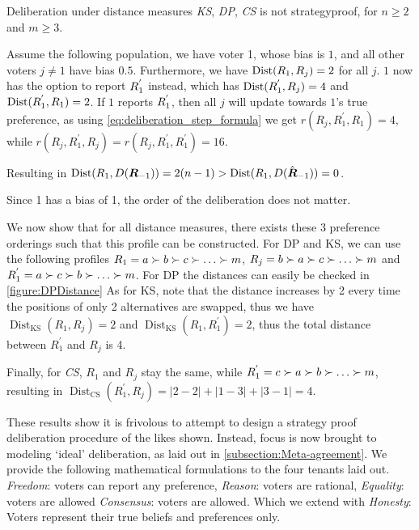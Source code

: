 \begin{proposition}
	Deliberation under distance measures \textit{KS}, \textit{ DP}, \textit{ CS} is not strategyproof, for $n \geq 2$ and $m \geq 3$.
\end{proposition}

\begin{proofc}
	Assume the following population, we have voter 1, whose bias is $1$, and all other voters $j \neq 1$ have bias $0.5$. Furthermore, we have $\operatorname{Dist}(R_1, R_j) = 2$ for all $j$. $1$ now has the option to report $R_{1}^{'}$ instead, which has $\operatorname{Dist}(R_{1}^{'}, R_j) = 4$ and $\operatorname{Dist}(R_{1}^{'}, R_1) = 2$. If $1$ reports $R_1^{'}$, then all $j$ will update towards $1$'s true preference, as using \cref{eq:deliberation_step_formula} we get $r(R_{j}, R_{1}^{'}, R_1) = 4$, while $r(R_{j}, R_{1}^{'}, R_j) = r(R_{j}, R_{1}^{'}, R_1^{'}) = 16$.

	Resulting in $\operatorname{Dist}(R_{1}, D(\boldsymbol{R}_{-1})) = 2(n-1) >  \operatorname{Dist}(R_{1}, D(\hat{\boldsymbol{R}}_{-1})) = 0$.

	Since 1 has a bias of 1, the order of the deliberation does not matter.

	We now show that for all distance measures, there exists these 3 preference orderings such that this profile can be constructed. For DP and KS, we can use the following profiles $R_{1}  = a \pref b \pref c \pref \dots \pref m$, $R_{j} = b \pref a \pref c \pref \dots \pref m$ and $R^{'}_{1} = a \pref c \pref b \pref \dots \pref m$. For DP the distances can easily be checked in \cref{figure:DPDistance} As for KS, note that the distance increases by 2 every time the positions of only 2 alternatives are swapped, thus we have $\operatorname{Dist}_{\text{KS}}(R_{1}, R_{j}) = 2$ and $\operatorname{Dist}_{\text{KS}}(R_{1}, R_{1}^{'}) = 2$, thus the total distance between $R_{1}^{'}$ and $R_{j}$ is 4.

	Finally, for \textit{CS}, $R_{1}$ and $R_{j}$ stay the same, while $R_{1}^{'} = c \pref a \pref b \pref \dots \pref m$, resulting in $\operatorname{Dist}_{\text{CS}}(R_{1}^{'}, R_{j}) = |2-2| + |1-3| + |3-1| = 4$.
\end{proofc}

These results show it is frivolous to attempt to design a strategy proof deliberation procedure of the likes shown. Instead, focus is now brought to modeling `ideal' deliberation, as laid out in \cref{subsection:Meta-agreement}. We provide the following mathematical formulations to the four tenants laid out. \textit{Freedom}: voters can report any preference, \textit{Reason}: voters are rational, \textit{Equality}: voters are allowed \textit{Consensus}:  voters are allowed. Which we extend with \textit{Honesty}: Voters represent their true beliefs and preferences only.


